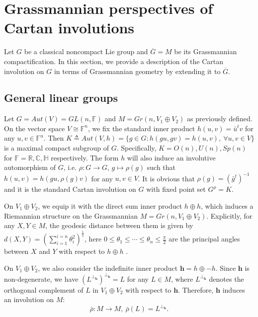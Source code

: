 \documentclass{article}
\begin{document}
\bigskip
\section{{\large Grassmannian perspectives of Cartan involutions}}
Let $G$ be a classical noncompact Lie group and $\overline{G}=M $ be its Grassmannian compactification.
In this section, we provide a description of the Cartan involution on $G$ in terms of Grassmannian geometry by extending it to $\overline{G} $.
\subsection{General linear groups}
Let $G=Aut(V)=GL(n,\mathbb{F})$ and $M=Gr(n, V_1\oplus V_2)$ as previously defined. On the vector space $V \cong \mathbb{F}^n$, we fix the standard inner product $h(u,v)=\bar{u}^tv$ for any $u,v \in \mathbb{F}^n$. Then
$K \triangleq Aut(V,h)= \{g \in G: h(gu,gv)=h(u,v), ~   \forall u,v \in V \}$ is a maximal
compact subgroup of $G$. Specifically,  $K=O(n),U(n),Sp(n)$ for $\mathbb{F}=\mathbb{R},\mathbb{C},\mathbb{H}$ respectively. The form $h$ will also induce an involutive automorphism of $G$, i.e. $\rho: G \rightarrow G$, $g \mapsto \rho(g)$ such that $h(u,v)=h(gu,\rho(g)v)$ for any $u,v \in V$.
It is obvious that $\rho(g)=(\bar{g}^t)^{-1}$ and it  is the standard Cartan involution on $G$ with fixed point set $G^{\rho}=K$.

On $V_1\oplus V_2$, we equip it with the direct sum inner product $h\oplus h$, which induces a Riemannian structure on the Grassmannian $M=Gr(n, V_1\oplus V_2)$. Explicitly, for any $X,Y \in M$, the geodesic distance between them is given by
$d(X,Y)=(\sum_{i=1}^{i=n} \theta_{i}^{2})^{\frac{1}{2}}$, here $0\leq \theta_{1} \leq \cdots \leq \theta_{n} \leq\frac{\pi}{2}$ are the principal angles between $X$ and $Y$
with respect to $h\oplus h$ \cite{Wong}\cite{YL}.

On $V_1\oplus V_2$, we also consider the indefinite inner product $\mathbf{h} =h\oplus -h$. Since $\mathbf{h}$ is non-degenerate, we have $(L^{\perp_{\mathbf{h}}})^{\perp_{\mathbf{h}}}=L$ for any $L \in M$, where $L^{\perp_{\mathbf{h}}}$
denotes the orthogonal complement of  $L$ in $V_1\oplus V_2$ with respect to $\mathbf{h}$.
Therefore, $\mathbf{h}$ induces an involution on $M$:
\[
\bar{\rho}: M \rightarrow M, ~  \bar{\rho}(L)=L^{\perp_{\mathbf{h}}}.
\]
\end{document}
